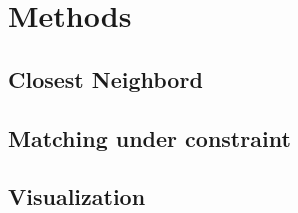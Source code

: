 \chapter{Methods}
\label{chap:methods}

\section{Closest Neighbord}


\section{Matching under constraint}

\section{Visualization}
